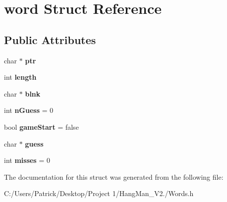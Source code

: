 \hypertarget{structword}{}\section{word Struct Reference}
\label{structword}
\subsection*{Public Attributes}
\begin{DoxyCompactItemize}
\item 
\mbox{\label{structword_a2192bf72555c734b1ddac0e2dba3819a}} 
char $\ast$ {\bfseries ptr}
\item 
\mbox{\label{structword_acffd72b4a66535f6410f67cf9fba62e8}} 
int {\bfseries length}
\item 
\mbox{\label{structword_aa4d29e2680a8828328da9b4415bb42f2}} 
char $\ast$ {\bfseries blnk}
\item 
\mbox{\label{structword_aca11ebee561ed8afb9408a44cfa6f002}} 
int {\bfseries n\+Guess} = 0
\item 
\mbox{\label{structword_a04efb65b7af1f10986bc0404f9115c24}} 
bool {\bfseries game\+Start} = false
\item 
\mbox{\label{structword_a72251d03bdba5c748dbe6a320a85204d}} 
char $\ast$ {\bfseries guess}
\item 
\mbox{\label{structword_a4b936e39219e1d5192b29179141f55ea}} 
int {\bfseries misses} = 0
\end{DoxyCompactItemize}


The documentation for this struct was generated from the following file\+:\begin{DoxyCompactItemize}
\item 
C\+:/\+Users/\+Patrick/\+Desktop/\+Project 1/\+Hang\+Man\+\_\+\+V2./Words.\+h\end{DoxyCompactItemize}
